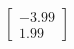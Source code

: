 \documentclass[preview]{standalone}
\begin{document}
\begin{align*}
\begin{bmatrix} -3.99 \\ 1.99 \end{bmatrix}
\end{align*}
\end{document}
